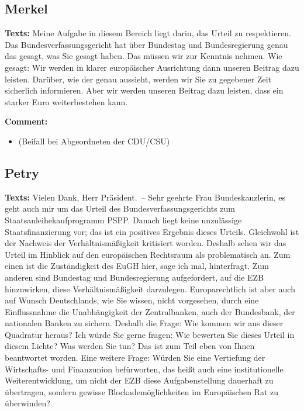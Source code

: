 \documentclass{article}
\begin{document}
\subsection{Merkel}
\noindent\textbf{Texts:} Meine Aufgabe in diesem Bereich liegt darin, das Urteil zu respektieren. Das Bundesverfassungsgericht hat über Bundestag und Bundesregierung genau das gesagt, was Sie gesagt haben. Das müssen wir zur Kenntnis nehmen. Wie gesagt: Wir werden in klarer europäischer Ausrichtung dann unseren Beitrag dazu leisten. Darüber, wie der genau aussieht, werden wir Sie zu gegebener Zeit sicherlich informieren. Aber wir werden unseren Beitrag dazu leisten, dass ein starker Euro weiterbestehen kann. 

\noindent\textbf{Comment:}
\begin{itemize}
    \setlength\itemsep{-3pt}
    \item (Beifall bei Abgeordneten der CDU/CSU)
\end{itemize}
\subsection{Petry}
\noindent\textbf{Texts:} Vielen Dank, Herr Präsident. – Sehr geehrte Frau Bundeskanzlerin, es geht auch mir um das Urteil des Bundesverfassungsgerichts zum Staatsanleihekaufprogramm PSPP. Danach liegt keine unzulässige Staatsfinanzierung vor; das ist ein positives Ergebnis dieses Urteils. Gleichwohl ist der Nachweis der Verhältnismäßigkeit kritisiert worden. Deshalb sehen wir das Urteil im Hinblick auf den europäischen Rechtsraum als problematisch an. Zum einen ist die Zuständigkeit des EuGH hier, sage ich mal, hinterfragt. Zum anderen sind Bundestag und Bundesregierung aufgefordert, auf die EZB hinzuwirken, diese Verhältnismäßigkeit darzulegen. Europarechtlich ist aber auch auf Wunsch Deutschlands, wie Sie wissen, nicht vorgesehen, durch eine Einflussnahme die Unabhängigkeit der Zentralbanken, auch der Bundesbank, der nationalen Banken zu sichern. Deshalb die Frage: Wie kommen wir aus dieser Quadratur heraus? Ich würde Sie gerne fragen: Wie bewerten Sie dieses Urteil in diesem Lichte? Was werden Sie tun? Das ist zum Teil eben von Ihnen beantwortet worden. Eine weitere Frage: Würden Sie eine Vertiefung der Wirtschafts- und Finanzunion befürworten, das heißt auch eine institutionelle Weiterentwicklung, um nicht der EZB diese Aufgabenstellung dauerhaft zu übertragen, sondern gewisse Blockademöglichkeiten im Europäischen Rat zu überwinden?
\end{document}
